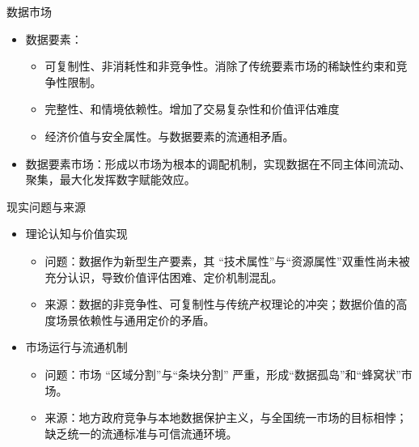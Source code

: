 \documentclass[10pt,aspectratio=169]{beamer}
\begin{document}
	
	
	
	
\begin{frame}{数据市场}
\begin{itemize}
	\item 数据要素：
	\begin{itemize}
		\item 可复制性、非消耗性和非竞争性。消除了传统要素市场的稀缺性约束和竞争性限制。
		\item 完整性、和情境依赖性。增加了交易复杂性和价值评估难度
		\item 经济价值与安全属性。与数据要素的流通相矛盾。
	\end{itemize}
	\item 数据要素市场：形成以市场为根本的调配机制，实现数据在不同主体间流动、聚集，最大化发挥数字赋能效应。

\end{itemize}


\end{frame}		
	
\begin{frame}{现实问题与来源}
\begin{itemize}
	\item 理论认知与价值实现
    \begin{itemize}
	\item 问题：数据作为新型生产要素，其 “技术属性”与“资源属性”双重性尚未被充分认识，导致价值评估困难、定价机制混乱。
	\item 来源：数据的非竞争性、可复制性与传统产权理论的冲突；数据价值的高度场景依赖性与通用定价的矛盾。
	\end{itemize}	
	\item 市场运行与流通机制
	\begin{itemize}
		\item 问题：市场 “区域分割”与“条块分割” 严重，形成“数据孤岛”和“蜂窝状”市场。
		\item 来源：地方政府竞争与本地数据保护主义，与全国统一市场的目标相悖；缺乏统一的流通标准与可信流通环境。
	\end{itemize}
	
\end{itemize}	
\end{frame}	
\end{document}
